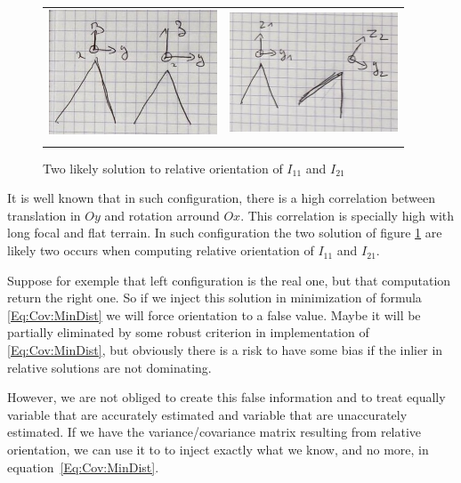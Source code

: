 \begin{figure}
\begin{center}
\begin{tabular}{||c|c||}
   \hline \hline
\includegraphics[width=50mm]{FIGS/Cov/Sol1.jpeg} &
\includegraphics[width=50mm]{FIGS/Cov/Sol2.jpeg} \\
  \\ \hline  \hline
\end{tabular}
\label{Fig:Cov:TwoSol}
\caption{Two likely solution to relative orientation of $I_{11}$ and $I_21$}
\end{center}
\end{figure}



It is well known that in such configuration,  there is a high correlation between
translation in $Oy$ and rotation arround $Ox$. This correlation is specially high
with long focal and flat terrain. In such configuration the two solution of figure
\ref{Fig:Cov:TwoSol} are likely two occurs when computing relative orientation of $I_{11}$ and $I_{21}$.


Suppose for exemple that left configuration is the real one, but that computation return the
right one.  So if we inject this solution in  minimization of formula \ref{Eq:Cov:MinDist} we 
will force  orientation to a false value. Maybe it will be partially eliminated by some 
robust criterion in implementation of \ref{Eq:Cov:MinDist}, but obviously there is a risk
to have some bias if the inlier in relative solutions are not dominating.

However, we are not obliged to create this false information and to treat equally variable
that are accurately estimated and variable that are unaccurately estimated. If we have
the variance/covariance matrix resulting from relative orientation, we can use it to
to inject exactly what we know, and no more, in equation~\ref{Eq:Cov:MinDist}.

